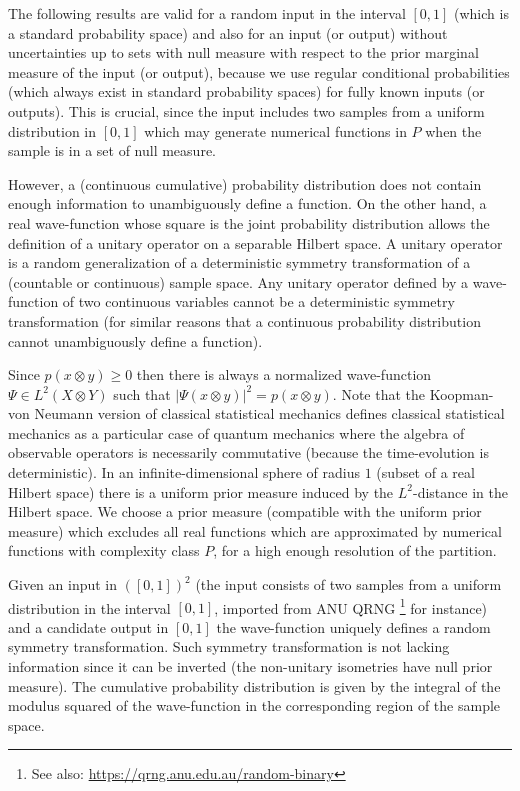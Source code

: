 \documentclass[11pt]{book}
\begin{document}
The following results are valid for a random input in the interval
\([0,1]\) (which is a standard probability space) and also for an input
(or output) without uncertainties up to sets with null measure with
respect to the prior marginal measure of the input (or output), because
we use regular conditional probabilities (which always exist in standard
probability
spaces\cite{durrett2019probability})
for fully known inputs (or outputs). This is crucial, since the input
includes two samples from a uniform distribution in \([0,1]\) which may
generate numerical functions in \(P\) when the sample is in a set of
null measure.

However, a (continuous cumulative) probability distribution does not
contain enough information to unambiguously define a function. On the
other hand, a real wave-function whose square is the joint probability
distribution allows the definition of a unitary operator on a separable
Hilbert space. A unitary operator is a random generalization of a
deterministic symmetry transformation of a (countable or continuous)
sample space. Any unitary operator defined by a wave-function of two
continuous variables cannot be a deterministic symmetry transformation
(for similar reasons that a continuous probability distribution cannot
unambiguously define a function).

Since \(p(x\otimes y)\geq 0\) then there is always a normalized
wave-function \(\Psi\in L^2(X\otimes Y)\) such that
\(|\Psi(x\otimes y)|^2=p(x\otimes y)\). Note that the Koopman-von
Neumann version of classical statistical
mechanics\cite{Sudarshan1976Interaction} defines classical statistical mechanics as a particular case of
quantum mechanics where the algebra of observable operators is
necessarily commutative (because the time-evolution is deterministic).
In an infinite-dimensional sphere of radius \(1\) (subset of a real
Hilbert space) there is a uniform prior measure induced by the
\(L^2\)-distance in the Hilbert space. We choose a prior measure
(compatible with the uniform prior measure) which excludes all real
functions which are approximated by numerical functions with complexity
class \(P\), for a high enough resolution of the partition.

Given an input in \(([0,1])^2\) (the input consists of two samples from
a uniform distribution in the interval \([0,1]\), imported from ANU QRNG
\cite{PhysRevApplied.3.054004}\footnote{See also: \url{https://qrng.anu.edu.au/random-binary}}
for instance) and a candidate output in \([0,1]\) the wave-function
uniquely defines a random symmetry transformation. Such symmetry
transformation is not lacking information since it can be inverted (the
non-unitary isometries have null prior measure). The cumulative
probability distribution is given by the integral of the modulus squared
of the wave-function in the corresponding region of the sample space.
\end{document}
